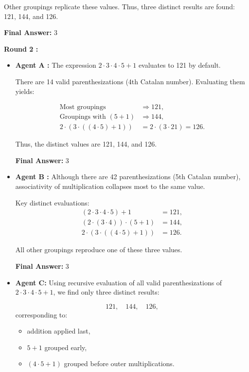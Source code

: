 \begin{tcolorbox}
\begin{itemize}[leftmargin=1.5em, nosep]
Other groupings replicate these values. Thus, three distinct results are found: 121, 144, and 126.

\medskip
\noindent\textbf{Final Answer:} $\boxed{3}$

    \end{itemize}

    \vspace{0.1cm}
    \textbf{Round 2 :}
    \begin{itemize}[leftmargin=1.5em, nosep]
        \item \textbf{Agent A :} The expression $2 \cdot 3 \cdot 4 \cdot 5 + 1$ evaluates to 121 by default.

There are 14 valid parenthesizations (4th Catalan number). Evaluating them yields:

\begin{align*}
\text{Most groupings} &\Rightarrow 121, \\
\text{Groupings with } (5+1) &\Rightarrow 144, \\
2 \cdot (3 \cdot ((4 \cdot 5) + 1)) &= 2 \cdot (3 \cdot 21) = 126.
\end{align*}

Thus, the distinct values are 121, 144, and 126.

\medskip
\noindent\textbf{Final Answer:} $\boxed{3}$

        \item \textbf{Agent B :} Although there are 42 parenthesizations (5th Catalan number), associativity of multiplication collapses most to the same value.

Key distinct evaluations:
\begin{align*}
(2 \cdot 3 \cdot 4 \cdot 5) + 1 &= 121, \\
(2 \cdot (3 \cdot 4)) \cdot (5 + 1) &= 144, \\
2 \cdot (3 \cdot ((4 \cdot 5) + 1)) &= 126.
\end{align*}

All other groupings reproduce one of these three values.

\medskip
\noindent\textbf{Final Answer:} $\boxed{3}$

        \item \textbf{Agent C:} Using recursive evaluation of all valid parenthesizations of $2 \cdot 3 \cdot 4 \cdot 5 + 1$, we find only three distinct results:

\[
121,\quad 144,\quad 126,
\]
corresponding to:
\begin{itemize}[left=0pt,topsep=2pt,itemsep=0pt]
    \item addition applied last,
    \item $5+1$ grouped early,
    \item $(4\cdot5 + 1)$ grouped before outer multiplications.
\end{itemize}


\end{itemize}
\end{tcolorbox}
